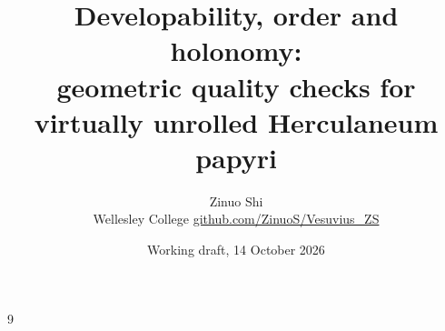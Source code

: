 \documentclass[11pt,a4paper]{article}
\title{Developability, order and holonomy:\\ geometric quality checks for virtually unrolled Herculaneum papyri}
\author{Zinuo Shi\\ \small Wellesley College \quad \href{https://github.com/ZinuoS/Vesuvius_ZS}{github.com/ZinuoS/Vesuvius\_ZS}}
\date{Working draft, 14 October 2026}
\theoremstyle{remark}
\begin{document}
\maketitle

\begin{abstract}

\end{abstract}










\begin{thebibliography}{9}

\end{thebibliography}

\appendix

\end{document}
